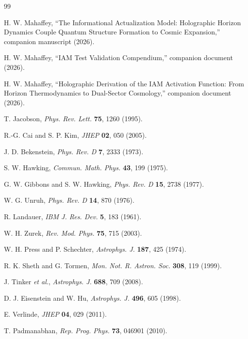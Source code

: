 \documentclass[aps,prd,twocolumn,superscriptaddress,nofootinbib]{revtex4-2}
\begin{document}
\begin{thebibliography}{99}

H. W. Mahaffey,
``The Informational Actualization Model: Holographic Horizon Dynamics Couple Quantum Structure Formation to Cosmic Expansion,''
companion manuscript (2026).

H. W. Mahaffey,
``IAM Test Validation Compendium,''
companion document (2026).

H. W. Mahaffey,
``Holographic Derivation of the IAM Activation Function: From Horizon Thermodynamics to Dual-Sector Cosmology,''
companion document (2026).

T. Jacobson,
\textit{Phys. Rev. Lett.} \textbf{75}, 1260 (1995).

R.-G. Cai and S. P. Kim,
\textit{JHEP} \textbf{02}, 050 (2005).

J. D. Bekenstein,
\textit{Phys. Rev. D} \textbf{7}, 2333 (1973).

S. W. Hawking,
\textit{Commun. Math. Phys.} \textbf{43}, 199 (1975).

G. W. Gibbons and S. W. Hawking,
\textit{Phys. Rev. D} \textbf{15}, 2738 (1977).

W. G. Unruh,
\textit{Phys. Rev. D} \textbf{14}, 870 (1976).

R. Landauer,
\textit{IBM J. Res. Dev.} \textbf{5}, 183 (1961).

W. H. Zurek,
\textit{Rev. Mod. Phys.} \textbf{75}, 715 (2003).

W. H. Press and P. Schechter,
\textit{Astrophys. J.} \textbf{187}, 425 (1974).

R. K. Sheth and G. Tormen,
\textit{Mon. Not. R. Astron. Soc.} \textbf{308}, 119 (1999).

J. Tinker \textit{et al.},
\textit{Astrophys. J.} \textbf{688}, 709 (2008).

D. J. Eisenstein and W. Hu,
\textit{Astrophys. J.} \textbf{496}, 605 (1998).

E. Verlinde,
\textit{JHEP} \textbf{04}, 029 (2011).

T. Padmanabhan,
\textit{Rep. Prog. Phys.} \textbf{73}, 046901 (2010).


\end{thebibliography}
\end{document}
